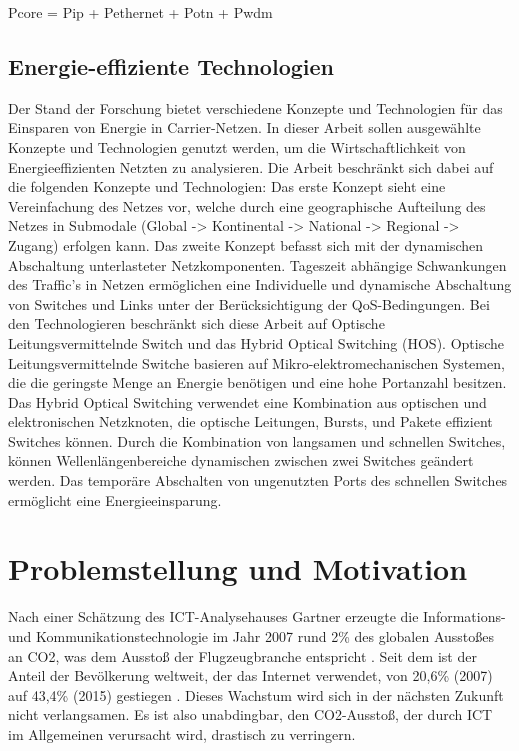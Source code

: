 \documentclass[12pt,titlepage]{article}
\begin{document}
Pcore = Pip + Pethernet + Potn + Pwdm


\subsection{Energie-effiziente Technologien}
Der Stand der Forschung bietet verschiedene Konzepte und Technologien für das Einsparen von Energie in Carrier-Netzen. In dieser Arbeit sollen ausgewählte Konzepte und Technologien genutzt werden, um die Wirtschaftlichkeit von Energieeffizienten Netzten zu analysieren. 
Die Arbeit beschränkt sich dabei auf die folgenden Konzepte und Technologien: 
Das erste Konzept sieht eine Vereinfachung des Netzes vor, welche durch eine geographische Aufteilung des Netzes in Submodale (Global -> Kontinental -> National -> Regional -> Zugang) erfolgen kann.
Das zweite Konzept befasst sich mit der dynamischen Abschaltung unterlasteter Netzkomponenten. Tageszeit abhängige Schwankungen des Traffic’s in Netzen ermöglichen eine Individuelle und dynamische Abschaltung von Switches und Links unter der Berücksichtigung der QoS-Bedingungen.  
Bei den Technologieren beschränkt sich diese Arbeit auf Optische Leitungsvermittelnde Switch und das Hybrid Optical Switching (HOS). 
Optische Leitungsvermittelnde Switche basieren auf Mikro-elektromechanischen Systemen, die die geringste Menge an Energie benötigen und eine hohe Portanzahl besitzen. Das Hybrid Optical Switching verwendet eine Kombination aus optischen und elektronischen Netzknoten, die optische Leitungen, Bursts, und Pakete effizient Switches können. Durch die Kombination von langsamen und schnellen Switches, können Wellenlängenbereiche dynamischen zwischen zwei Switches geändert werden. Das temporäre Abschalten von ungenutzten Ports des schnellen Switches ermöglicht eine Energieeinsparung. 


\section{Problemstellung und Motivation}
Nach einer Schätzung des ICT-Analysehauses Gartner erzeugte die Informations- und Kommunikationstechnologie im Jahr 2007 rund 2\% des globalen Ausstoßes an CO2, was dem Ausstoß der Flugzeugbranche entspricht \cite{gartner}. Seit dem ist der Anteil der Bevölkerung weltweit, der das Internet verwendet, von 20,6\% (2007) auf 43,4\% (2015) gestiegen \citep{itu}. Dieses Wachstum wird sich in der nächsten Zukunft nicht verlangsamen. Es ist also unabdingbar, den CO2-Ausstoß, der durch ICT im Allgemeinen verursacht wird, drastisch zu verringern.
\end{document}

